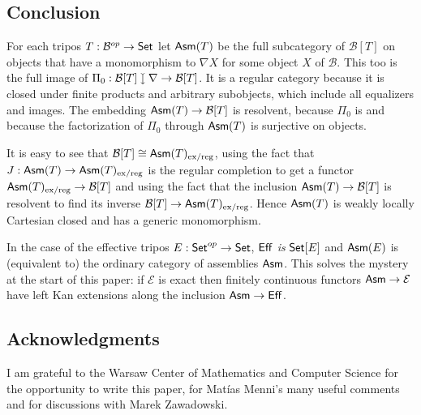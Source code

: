 \documentclass[sort&compress]{elsarticle}
\theoremstyle{plain}
\theoremstyle{definition}
\theoremstyle{remark}
\newcommand\hide[1]{}
\newcommand\cat\mathcal
\newcommand{\downmono}{\mathbin{\rotatebox[origin=c]{-90}{$\rightarrowtail$}}}
\newcommand\exreg{_\mathrm{ex/reg}}
\begin{document}
\subsection{Conclusion} 
For each tripos $T:\cat B\dual \to \Set$ let $\mathsf{Asm}(T)$ be the full subcategory of $\cat B[T]$ on objects that have a monomorphism to $\nabla X$ for some object $X$ of $\cat B$. This too is the full image of $\Pi_0:\cat B[T]\downmono \nabla \to \cat B[T]$. It is a regular category because it is closed under finite products and arbitrary subobjects, which include all equalizers and images. The embedding $\Asm(T) \to \cat B[T]$ is resolvent, because $\Pi_0$ is and because the factorization of $\Pi_0$ through $\mathsf{Asm}(T)$ is surjective on objects.

It is easy to see that $\cat B[T] \cong \Asm(T)\exreg$, using the fact that $J:\Asm(T) \to \Asm(T)\exreg$ is the regular completion to get a functor $\Asm(T)\exreg \to \cat B[T]$ and using the fact that the inclusion $\Asm(T)\to \cat B[T]$ is resolvent to find its inverse $\cat B[T] \to \Asm(T)\exreg$.
Hence $\mathsf{Asm}(T)$ is weakly locally Cartesian closed and has a generic monomorphism.

In the case of the effective tripos $E:\mathsf{Set}^{op} \to \mathsf{Set}$, $\mathsf{Eff}$ \emph{is} $\mathsf{Set}[E]$ and $\mathsf{Asm}(E)$ is (equivalent to) the ordinary category of assemblies $\mathsf{Asm}$. This solves the mystery at the start of this paper: if $\cat E$ is exact then finitely continuous functors $\Asm \to\cat E$ have left Kan extensions along the inclusion $\mathsf{Asm}\to \mathsf{Eff}$.


\hide{ Analyse: morfismes van tripossen. Probleem: $\Tot(T)$ is niet finitely complete. Misschien iets voor een ander artikel dus. }

\subsection*{Acknowledgments} 
I am grateful to the Warsaw Center of Mathematics and Computer Science for the opportunity to write this paper, for Mat\'ias Menni's many useful comments and for discussions with Marek Zawadowski.



{}
\end{document}
